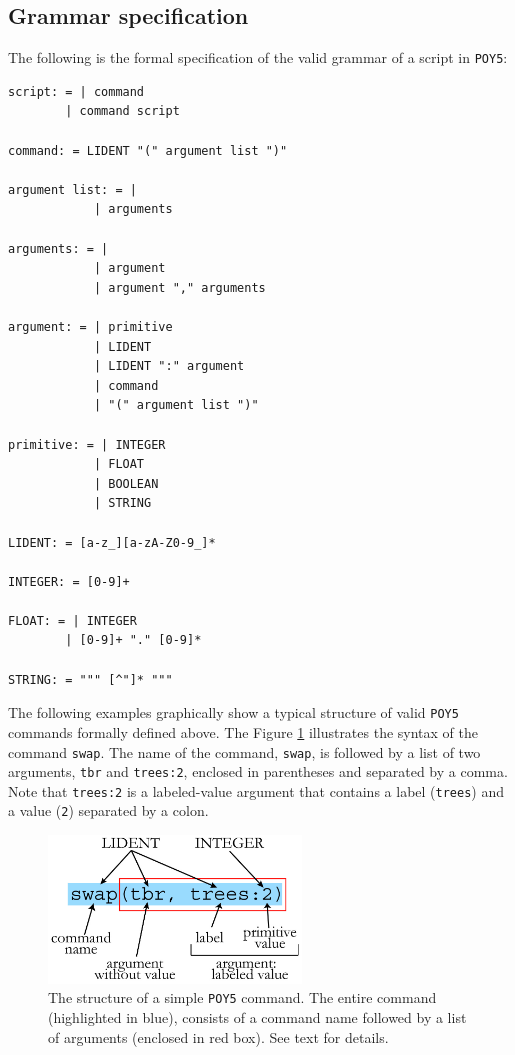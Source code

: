 \documentclass[11pt]{book}
\newcommand{\commandstyle}[1]{\texttt{#1}}
\newcommand{\poycommand}[1]{\commandstyle{#1}}
\newcommand{\poyargument}[1]{\commandstyle{#1}}
\newcommand{\poy}{\commandstyle{POY5}\xspace}
\begin{document}
\subsection{Grammar specification}

The following is the formal specification of the valid grammar of a script in \poy:

\begin{verbatim}
script: = | command
        | command script

command: = LIDENT "(" argument list ")"

argument list: = |
            | arguments

arguments: = |
            | argument
            | argument "," arguments

argument: = | primitive
            | LIDENT
            | LIDENT ":" argument
            | command
            | "(" argument list ")"

primitive: = | INTEGER
            | FLOAT
            | BOOLEAN
            | STRING

LIDENT: = [a-z_][a-zA-Z0-9_]*

INTEGER: = [0-9]+

FLOAT: = | INTEGER
        | [0-9]+ "." [0-9]*

STRING: = """ [^"]* """

\end{verbatim}

The following examples graphically show a typical structure of valid \poy commands
formally defined above. The Figure \ref{simplecommand} illustrates
the syntax of the command \poycommand{swap}. The name of the
command, \poycommand{swap}, is followed by a list of two arguments,
\poyargument{tbr} and \poyargument{trees:2}, enclosed in parentheses
and separated by a comma. Note that \poyargument{trees:2} is a labeled-value
argument that contains a label (\texttt{trees}) and a value (\texttt{2})
separated by a colon.

\begin{figure}[htbp]
   \centering
   \includegraphics[width=0.60\textwidth]{doc/figures/fig-poycommand1.jpg}
   \caption{The structure of a simple \poy command. The entire command (highlighted
   in blue), consists of  a command name followed by a list of arguments (enclosed in red box).
   See text for details.}
   \label{simplecommand}
\end{figure}
\end{document}
